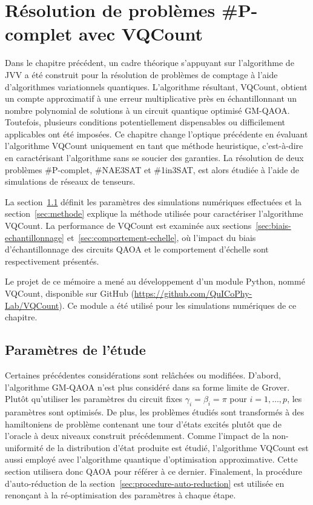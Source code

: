 \chapter{Résolution de problèmes \textsf{\#P}-complet avec VQCount}
\label{cha:resolution-de-problemes-avec-vqcount}

Dans le chapitre précédent, un cadre théorique s'appuyant sur l'algorithme de JVV a été construit pour la résolution de problèmes de comptage à l'aide d'algorithmes variationnels quantiques. L'algorithme résultant, VQCount, obtient un compte approximatif à une erreur multiplicative près en échantillonnant un nombre polynomial de solutions à un circuit quantique optimisé GM-QAOA. Toutefois, plusieurs conditions potentiellement dispensables ou difficilement applicables ont été imposées. Ce chapitre change l'optique précédente en évaluant l'algorithme VQCount uniquement en tant que méthode heuristique, c'est-à-dire en caractérisant l'algorithme sans se soucier des garanties. La résolution de deux problèmes \textsf{\#P}-complet, \#NAE3SAT et \#1in3SAT, est alors étudiée à l'aide de simulations de réseaux de tenseurs.

La section~\ref{sec:parametres-de-etude} définit les paramètres des simulations numériques effectuées et la section~\ref{sec:methode} explique la méthode utilisée pour caractériser l'algorithme VQCount. La performance de VQCount est examinée aux sections~\ref{sec:biais-echantillonnage} et~\ref{sec:comportement-echelle}, où l'impact du biais d'échantillonnage des circuits QAOA et le comportement d'échelle sont respectivement présentés.

Le projet de ce mémoire a mené au développement d'un module Python, nommé VQCount, disponible sur GitHub (\url{https://github.com/QuICoPhy-Lab/VQCount}). Ce module a été utilisé pour les simulations numériques de ce chapitre. 



\section{Paramètres de l'étude}
\label{sec:parametres-de-etude}

Certaines précédentes considérations sont relâchées ou modifiées. D'abord, 
l'algorithme GM-QAOA n'est plus considéré dans sa forme limite de Grover. Plutôt qu'utiliser les paramètres du circuit fixes $\gamma_{i}=\beta_{i}=\pi$ pour $i=1,\dots,p$, les paramètres sont optimisés. De plus, les problèmes étudiés sont transformés à des hamiltoniens de problème contenant une tour d'états excités plutôt que de l'oracle à deux niveaux construit précédemment. Comme l'impact de la non-uniformité de la distribution d'état produite est étudié, l'algorithme VQCount est aussi employé avec l'algorithme quantique d'optimisation approximative. Cette section utilisera donc QAOA pour référer à ce dernier. Finalement, la procédure d'auto-réduction de la section~\ref{sec:procedure-auto-reduction} est utilisée en renonçant à la ré-optimisation des paramètres à chaque étape.

